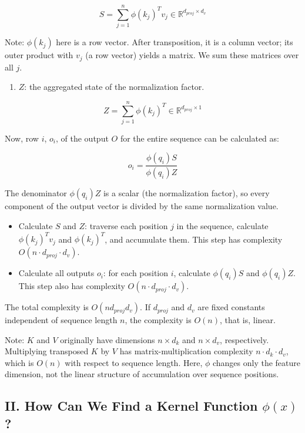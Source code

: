 \[
S = \sum_{j=1}^{n}\phi(k_j)^T v_j \in \mathbb{R}^{d_{proj}\times d_v}
\]

Note: \(\phi(k_j)\) here is a row vector. After transposition, it is a column vector; its outer product with \(v_j\) (a row vector) yields a matrix. We sum these matrices over all \(j\).

\begin{enumerate}
\def\labelenumi{\arabic{enumi}.}
\setcounter{enumi}{1}
\tightlist
\item
  \(Z\): the aggregated state of the normalization factor.
\end{enumerate}

\[
Z = \sum_{j=1}^{n}\phi(k_j)^T \in \mathbb{R}^{d_{proj}\times 1}
\]

Now, row \(i\), \(o_i\), of the output \(O\) for the entire sequence can be calculated as:

\[
o_i = \frac{\phi(q_i)S}{\phi(q_i)Z}
\]

The denominator \(\phi(q_i)Z\) is a scalar (the normalization factor), so every component of the output vector is divided by the same normalization value.

\begin{itemize}
\tightlist
\item
  Calculate \(S\) and \(Z\): traverse each position \(j\) in the sequence, calculate \(\phi(k_j)^T v_j\) and \(\phi(k_j)^T\), and accumulate them. This step has complexity \(O(n\cdot d_{proj}\cdot d_v)\).
\item
  Calculate all outputs \(o_i\): for each position \(i\), calculate \(\phi(q_i)S\) and \(\phi(q_i)Z\). This step also has complexity \(O(n\cdot d_{proj}\cdot d_v)\).
\end{itemize}

The total complexity is \(O(nd_{proj}d_v)\). If \(d_{proj}\) and \(d_v\) are fixed constants independent of sequence length \(n\), the complexity is \(O(n)\), that is, linear.

Note: \(K\) and \(V\) originally have dimensions \(n \times d_k\) and \(n \times d_v\), respectively. Multiplying transposed \(K\) by \(V\) has matrix-multiplication complexity \(n\cdot d_k\cdot d_v\), which is \(O(n)\) with respect to sequence length. Here, \(\phi\) changes only the feature dimension, not the linear structure of accumulation over sequence positions.

\hypertarget{ii.-how-can-we-find-a-kernel-function-phix}{%
\subsection{\texorpdfstring{II. How Can We Find a Kernel Function \(\phi(x)\)?}{II. How Can We Find a Kernel Function \textbackslash phi(x)?}}\label{ii.-how-can-we-find-a-kernel-function-phix}}


